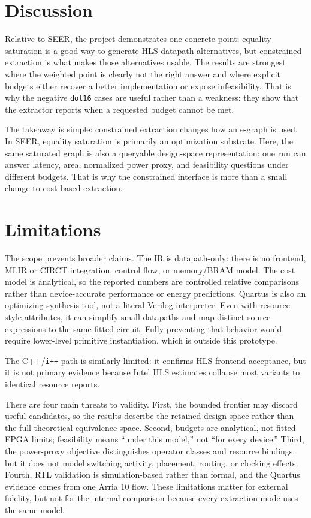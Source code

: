 \documentclass[sigplan,10pt,review]{acmart}
\begin{document}
\section{Discussion}
\begin{sloppypar}
Relative to SEER, the project demonstrates one concrete point: equality saturation is a good way to generate HLS datapath alternatives, but constrained extraction is what makes those alternatives usable. The results are strongest where the weighted point is clearly not the right answer and where explicit budgets either recover a better implementation or expose infeasibility. That is why the negative \texttt{dot16} cases are useful rather than a weakness: they show that the extractor reports when a requested budget cannot be met.

The takeaway is simple: constrained extraction changes how an e-graph is used. In SEER, equality saturation is primarily an optimization substrate. Here, the same saturated graph is also a queryable design-space representation: one run can answer latency, area, normalized power proxy, and feasibility questions under different budgets. That is why the constrained interface is more than a small change to cost-based extraction.
\end{sloppypar}

\section{Limitations}
\begin{sloppypar}
The scope prevents broader claims. The IR is datapath-only: there is no frontend, MLIR or CIRCT integration, control flow, or memory/BRAM model. The cost model is analytical, so the reported numbers are controlled relative comparisons rather than device-accurate performance or energy predictions. Quartus is also an optimizing synthesis tool, not a literal Verilog interpreter. Even with resource-style attributes, it can simplify small datapaths and map distinct source expressions to the same fitted circuit. Fully preventing that behavior would require lower-level primitive instantiation, which is outside this prototype.

The C++/\texttt{i++} path is similarly limited: it confirms HLS-frontend acceptance, but it is not primary evidence because Intel HLS estimates collapse most variants to identical resource reports.

There are four main threats to validity. First, the bounded frontier may discard useful candidates, so the results describe the retained design space rather than the full theoretical equivalence space. Second, budgets are analytical, not fitted FPGA limits; feasibility means ``under this model,'' not ``for every device.'' Third, the power-proxy objective distinguishes operator classes and resource bindings, but it does not model switching activity, placement, routing, or clocking effects. Fourth, RTL validation is simulation-based rather than formal, and the Quartus evidence comes from one Arria 10 flow. These limitations matter for external fidelity, but not for the internal comparison because every extraction mode uses the same model.
\end{sloppypar}
\end{document}
